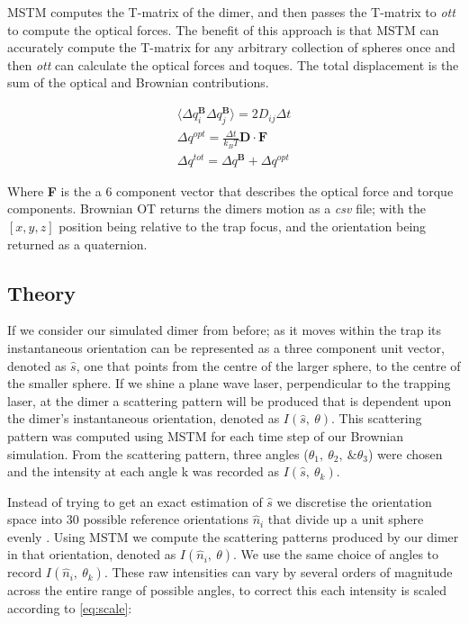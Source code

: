 \documentclass[final, 3p]{elsarticle}
\begin{document}
MSTM computes the T-matrix of the dimer, and then passes the T-matrix to \textit{ott} to compute the optical forces. The benefit of this approach is that MSTM can accurately compute the T-matrix for any arbitrary collection of spheres once and then \textit{ott} can calculate the optical forces and toques. The total displacement is the sum of the optical and Brownian contributions.

\begin{align}
	\langle \Delta q_i^{\textbf{B}} \Delta q_j^{\textbf{B}}\rangle = 2D_{ij} \Delta t \\
	\Delta q^{opt} = \frac{\Delta t}{k_BT}\textbf{D} \cdot \textbf{F} \\
	\Delta q^{tot} = \Delta q^{\textbf{B}} + \Delta q^{opt}
\end{align}

Where \textbf{F} is the a 6 component vector that describes the optical force and torque components. Brownian OT returns the dimers motion as a \textit{csv} file; with the $[x,y,z]$ position being relative to the trap focus, and the orientation being returned as a quaternion. 

\subsection{Theory}
\label{sec:2.2}

If we consider our simulated dimer from before; as it moves within the trap its instantaneous orientation can be represented as a three component unit vector, denoted as $\hat{s}$, one that points from the centre of the larger sphere, to the centre of the smaller sphere. If we shine a plane wave laser, perpendicular to the trapping laser, at the dimer a scattering pattern will be produced that is dependent upon the dimer's instantaneous orientation, denoted as $I(\hat{s},\ \theta)$. This scattering pattern was computed using MSTM for each time step of our Brownian simulation. From the scattering pattern, three angles ($\theta_1,\ \theta_2,\ \& \theta_3$) were chosen and the intensity at each angle k was recorded as $I(\hat{s},\ \theta_k)$. 

Instead of trying to get an exact estimation of $\hat{s}$ we discretise the orientation space into 30 possible reference orientations $\hat{n}_i$ that divide up a unit sphere evenly \cite{Rey2006}. Using MSTM we compute the scattering patterns produced by our dimer in that orientation, denoted as $I(\hat{n}_i, \ \theta)$. We use the same choice of angles to record $I(\hat{n}_i, \ \theta_k)$. These raw intensities can vary by several orders of magnitude across the entire range of possible angles, to correct this each intensity is scaled according to \eqref{eq:scale}:
\end{document}
